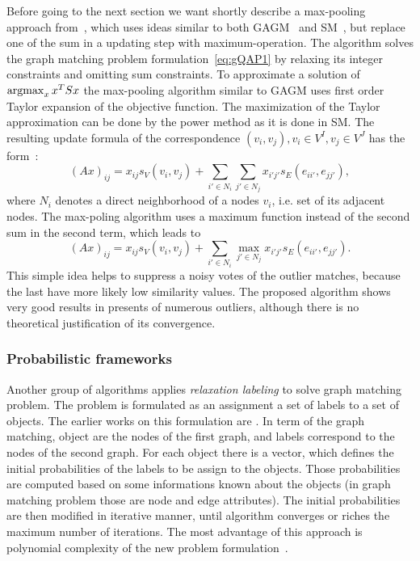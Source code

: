 Before going to the next section we want shortly describe a max-pooling approach from~\cite{Cho2014_Haystack}, which uses ideas similar to both GAGM~\cite{Rangarajan1996_GAGM} and SM~\cite{Leordeanu2005_SM}, but replace one of the sum in a updating step with maximum-operation. The algorithm solves the graph matching problem formulation~\eqref{eq:gQAP1} by relaxing its integer constraints and omitting sum constraints. To approximate a solution of $\mathop{\rm argmax}_{x}x^TSx$ the max-pooling algorithm similar to GAGM uses first order Taylor expansion of the objective function. The maximization of the Taylor approximation can be done by the power method as it is done in SM.
The resulting update formula of the correspondence $(v_i,v_j),v_i\in V^I,v_j\in V^J$ has the form~\cite{Cho2014_Haystack}:
\begin{equation}
(Ax)_{ij}=x_{ij}s_V(v_i,v_{j})+\sum_{i'\in N_i}\sum_{j'\in N_j}x_{i'j'}s_E(e_{ii'},e_{jj'}),
\end{equation}
where $N_i$ denotes a direct neighborhood of a nodes $v_i$, i.e. set of its adjacent nodes.
The max-poling algorithm uses a maximum function instead of the second sum in the second term, which leads to
\begin{equation}
(Ax)_{ij}=x_{ij}s_V(v_i,v_{j})+\sum_{i'\in N_i}\max_{j'\in N_j}x_{i'j'}s_E(e_{ii'},e_{jj'}).
\end{equation}
This simple idea helps to suppress a noisy votes of the outlier matches, because the last have more likely low similarity values. The proposed algorithm shows very good results in presents of numerous outliers, although there is no theoretical justification of its convergence.

\subsubsection{Probabilistic frameworks}
Another group of algorithms applies \emph{relaxation labeling} to solve graph matching problem. The problem is formulated as an assignment a set of labels to a set of objects. The earlier works on this formulation are \cite{Fischler1973, Rosenfeld1976}. In term of the graph matching, object are the nodes of the first graph, and labels correspond to the nodes of the second graph. For each object there is a vector, which defines the initial probabilities of the labels to be assign to the objects. Those probabilities are computed based on some informations known about the objects (in graph matching problem those are node and edge attributes). The initial probabilities are then modified in iterative manner, until algorithm converges or riches the maximum number of iterations. 
The most advantage of this approach is polynomial complexity of the new problem formulation~\cite{Christmas1995}.

